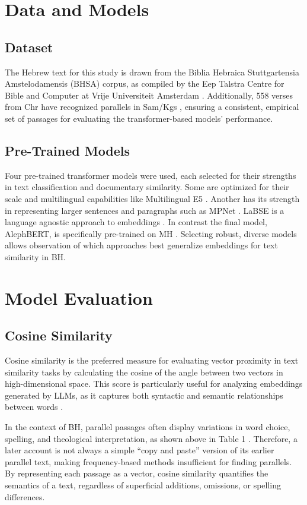 \documentclass[12pt]{article}
\begin{document}
\section{Data and Models}
\subsection{Dataset}
The Hebrew text for this study is drawn from the Biblia Hebraica Stuttgartensia Amstelodamensis (BHSA) corpus, as compiled by the Eep Talstra Centre for Bible and Computer at Vrije Universiteit Amsterdam \cite{vanPeursen}. Additionally, 558 verses from Chr have recognized parallels in Sam/Kgs \cite{Enders}, ensuring a consistent, empirical set of passages for evaluating the transformer-based models' performance.

\subsection{Pre-Trained Models}
Four pre-trained transformer models were used, each selected for their strengths in text classification and documentary similarity. Some are optimized for their scale and multilingual capabilities like Multilingual E5 \cite{Wang}. Another has its strength in representing larger sentences and paragraphs such as MPNet \cite{Song}. LaBSE is a language agnostic approach to embeddings \cite{Feng}. In contrast the final model, AlephBERT, is specifically pre-trained on MH \cite{Seker}. Selecting robust, diverse models allows observation of which approaches best generalize embeddings for text similarity in BH.

\section{Model Evaluation}
\subsection{Cosine Similarity}
Cosine similarity is the preferred measure for evaluating vector proximity in text similarity tasks by calculating the cosine of the angle between two vectors in high-dimensional space. This score is particularly useful for analyzing embeddings generated by LLMs, as it captures both syntactic and semantic relationships between words \cite{Gomez}.

In the context of BH, parallel passages often display variations in word choice, spelling, and theological interpretation, as shown above in Table 1 \cite{Kalimi}. Therefore, a later account is not always a simple “copy and paste” version of its earlier parallel text, making frequency-based methods insufficient for finding parallels. By representing each passage as a vector, cosine similarity quantifies the semantics of a text, regardless of superficial additions, omissions, or spelling differences.
\end{document}
